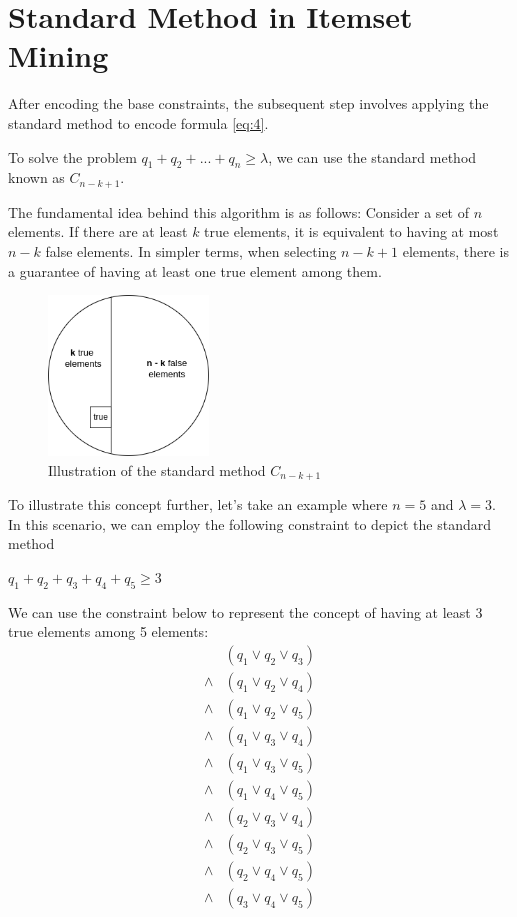 \section{Standard Method in Itemset Mining}

After encoding the base constraints,
the subsequent step involves applying the standard method to encode formula \ref{eq:4}.

To solve the problem $q_1 + q_2 + ... + q_n \ge \lambda$, we can use the standard method known as $C_{n-k+1}$.

The fundamental idea behind this algorithm is as follows: Consider a set of $n$ elements.
If there are at least $k$ true elements, it is equivalent to having at most $n-k$ false elements.
In simpler terms, when selecting $n-k+1$ elements, there is a guarantee of having at least one true element among them.

\begin{figure}[H]
    \centering
    \includegraphics[width=0.38\textwidth]{chapter2/image/standard.png}
    \caption{Illustration of the standard method $C_{n-k+1}$}
    \label{fig:2_1}
\end{figure}

To illustrate this concept further, let's take an example where $n = 5$ and $\lambda = 3$.
In this scenario, we can employ the following constraint to depict the standard method

\begin{center}
    $q_1 + q_2 + q_3 + q_4 + q_5 \ge 3$
\end{center}

We can use the constraint below to represent the concept of having at least 3 true elements among 5 elements:
\begin{equation}
    \label{eq:5}
    \begin{aligned}
               & (q_1 \vee q_2 \vee q_3) \\
        \wedge & (q_1 \vee q_2 \vee q_4) \\
        \wedge & (q_1 \vee q_2 \vee q_5) \\
        \wedge & (q_1 \vee q_3 \vee q_4) \\
        \wedge & (q_1 \vee q_3 \vee q_5) \\
        \wedge & (q_1 \vee q_4 \vee q_5) \\
        \wedge & (q_2 \vee q_3 \vee q_4) \\
        \wedge & (q_2 \vee q_3 \vee q_5) \\
        \wedge & (q_2 \vee q_4 \vee q_5) \\
        \wedge & (q_3 \vee q_4 \vee q_5) \\
    \end{aligned}
\end{equation}

